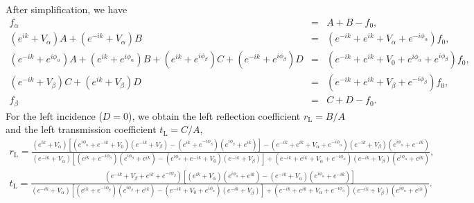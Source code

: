\documentclass[prl,showpacs,superscriptaddress,twocolumn]{revtex4-1}
\begin{document}
\begin{widetext}
After simplification, we have%
\begin{eqnarray}
f_{\alpha } &=&A+B-f_{0}, \\
\left( e^{ik}+V_{\alpha }\right) A+\left( e^{-ik}+V_{\alpha }\right) B
&=&\left( e^{-ik}+e^{ik}+V_{\alpha }+e^{-i\phi _{\alpha }}\right) f_{0}, \\
\left( e^{-ik}+e^{i\phi _{\alpha }}\right) A+\left( e^{ik}+e^{i\phi _{\alpha
}}\right) B+\left( e^{ik}+e^{i\phi _{\beta }}\right) C+\left(
e^{-ik}+e^{i\phi _{\beta }}\right) D &=&\left( e^{-ik}+e^{ik}+V_{0}+e^{i\phi
_{\alpha }}+e^{i\phi _{\beta }}\right) f_{0}, \\
\left( e^{-ik}+V_{\beta }\right) C+\left( e^{ik}+V_{\beta }\right) D
&=&\left( e^{-ik}+e^{ik}+V_{\beta }+e^{-i\phi _{\beta }}\right) f_{0}, \\
f_{\beta } &=&C+D-f_{0}.
\end{eqnarray}%
For the left incidence ($D=0$), we obtain the left reflection coefficient $%
r_{\mathrm{L}}=B/A$ and the left transmission coefficient $t_{\mathrm{L}%
}=C/A $,%
\begin{equation}
\begin{array}{l}
r_{\mathrm{L}}=\frac{\left( e^{ik}+V_{\alpha }\right) \left[ \left( e^{i\phi
_{\alpha }}+e^{-ik}+V_{0}\right) \left( e^{-ik}+V_{\beta }\right) -\left(
e^{ik}+e^{-i\phi _{\beta }}\right) \left( e^{i\phi _{\beta }}+e^{ik}\right) %
\right] -\left( e^{-ik}+e^{ik}+V_{\alpha }+e^{-i\phi _{\alpha }}\right)
\left( e^{-ik}+V_{\beta }\right) \left( e^{i\phi _{\alpha }}+e^{-ik}\right)
}{\left( e^{-ik}+V_{\alpha }\right) \left[ \left( e^{ik}+e^{-i\phi _{\beta
}}\right) \left( e^{i\phi _{\beta }}+e^{ik}\right) -\left( e^{i\phi _{\alpha
}}+e^{-ik}+V_{0}\right) \left( e^{-ik}+V_{\beta }\right) \right] +\left(
e^{-ik}+e^{ik}+V_{\alpha }+e^{-i\phi _{\alpha }}\right) \left(
e^{-ik}+V_{\beta }\right) \left( e^{i\phi _{\alpha }}+e^{ik}\right) }, \\
t_{\mathrm{L}}=\frac{\left( e^{-ik}+V_{\beta }+e^{ik}+e^{-i\phi _{\beta
}}\right) \left[ \left( e^{ik}+V_{\alpha }\right) \left( e^{i\phi _{\alpha
}}+e^{ik}\right) -\left( e^{-ik}+V_{\alpha }\right) \left( e^{i\phi _{\alpha
}}+e^{-ik}\right) \right] }{\left( e^{-ik}+V_{\alpha }\right) \left[ \left(
e^{ik}+e^{-i\phi _{\beta }}\right) \left( e^{i\phi _{\beta }}+e^{ik}\right)
-\left( e^{-ik}+V_{0}+e^{i\phi _{\alpha }}\right) \left( e^{-ik}+V_{\beta
}\right) \right] +\left( e^{-ik}+e^{ik}+V_{\alpha }+e^{-i\phi _{\alpha
}}\right) \left( e^{-ik}+V_{\beta }\right) \left( e^{i\phi _{\alpha
}}+e^{ik}\right) }.%
\end{array}

\end{equation}
\end{widetext}
\end{document}
